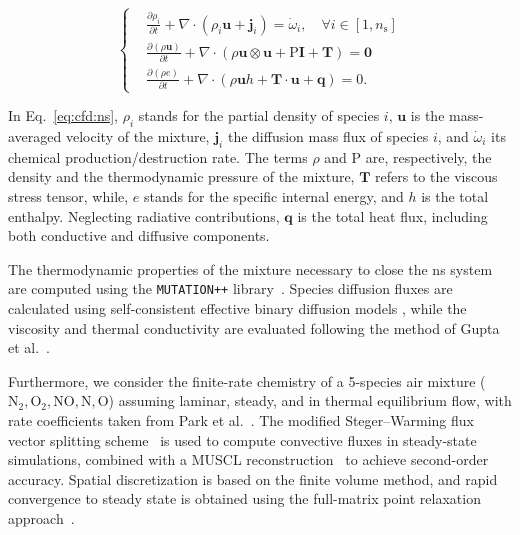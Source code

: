 \begin{equation}
  \left\{
\begin{aligned}
  &\frac{\partial \rho_i}{\partial t} + \nabla \cdot (\rho_i \mathbf{u} + \mathbf{j}_i) = \dot{\omega}_i, \quad \forall i \in [1, n_{\text{s}}]\\
  &\frac{\partial (\rho \mathbf{u})}{\partial t} + \nabla \cdot \left(\rho \mathbf{u} \otimes \mathbf{u} + \mathrm{P} \mathbf{I} + \mathbf{T}\right) = \mathbf{0} \\
  &\frac{\partial (\rho e)}{\partial t} + \nabla \cdot \left(\rho\mathbf{u} h + \mathbf{T} \cdot \mathbf{u} + \mathbf{q}\right) = 0.
\end{aligned}
\label{eq:cfd:ns}
\right.
\end{equation}

In Eq.~\ref{eq:cfd:ns}, $\rho_i$ stands for the partial density of species $i$, $\mathbf{u}$ is the mass-averaged velocity of the mixture, $\mathbf{j}_i$ the diffusion mass flux of species $i$, and $\dot{\omega}_i$ its chemical production/destruction rate. The terms $\rho$ and $\mathrm{P}$ are, respectively, the density and the thermodynamic pressure of the mixture, $\mathbf{T}$ refers to the viscous stress tensor, while, $e$ stands for the specific internal energy, and $h$ is the total enthalpy. Neglecting radiative contributions, $\mathbf{q}$ is the total heat flux, including both conductive and diffusive components. 

\smallskip
The thermodynamic properties of the mixture necessary to close the \gls{ns} system are computed using the \texttt{MUTATION++} library~\cite{polynomialNASA, MUTATIONPP, capriati2021development}. Species diffusion fluxes are calculated using self-consistent effective binary diffusion models \cite{Ramshaw}, while the viscosity and thermal conductivity are evaluated following the method of Gupta et al.~\cite{ViscosityThermalCond}.

\smallskip
Furthermore, we consider the finite-rate chemistry of a 5-species air mixture (\(\text{N}_2, \text{O}_2, \text{NO}, \text{N}, \text{O}\)) assuming laminar, steady, and in thermal equilibrium flow, with rate coefficients taken from Park et al.~\cite{Park}. The modified Steger–Warming flux vector splitting scheme~\cite{StegerWarming} is used to compute convective fluxes in steady-state simulations, combined with a MUSCL reconstruction~\cite{MUSCL} to achieve second-order accuracy. Spatial discretization is based on the finite volume method, and rapid convergence to steady state is obtained using the full-matrix point relaxation approach~\cite{FMPR}.

